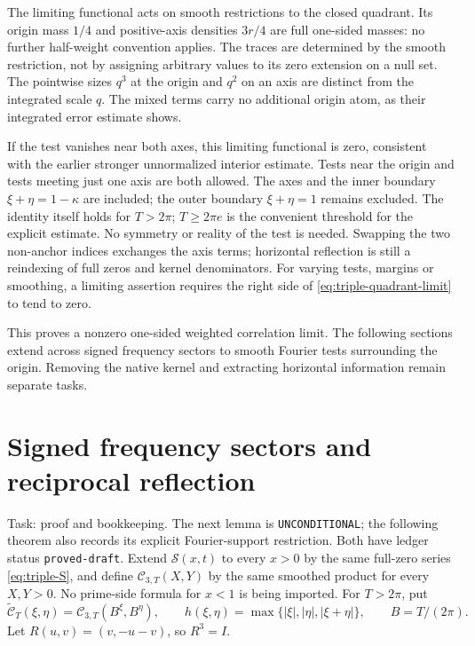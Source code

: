\documentclass[11pt]{article}
\newcommand{\ZS}{\mathcal S}
\newcommand{\CT}{\mathcal C_{3,T}}
\begin{document}
The limiting functional acts on smooth restrictions to the closed
quadrant. Its origin mass \(1/4\) and positive-axis densities \(3r/4\)
are full one-sided masses: no further half-weight convention applies.
The traces are determined by the smooth restriction, not by assigning
arbitrary values to its zero extension on a null set. The pointwise
sizes \(q^3\) at the origin and \(q^2\) on an axis are distinct from
the integrated scale \(q\). The mixed terms carry no additional origin
atom, as their integrated error estimate shows.

If the test vanishes near both axes, this limiting functional is zero,
consistent with the earlier stronger unnormalized interior estimate.
Tests near the origin and tests meeting just one axis are both allowed.
The axes and the inner boundary \(\xi+\eta=1-\kappa\) are included;
the outer boundary \(\xi+\eta=1\) remains excluded. The identity itself
holds for \(T>2\pi\); \(T\geq2\pi e\) is the convenient threshold
for the explicit estimate. No symmetry or reality of the test is needed.
Swapping the two non-anchor indices exchanges the axis terms; horizontal
reflection is still a reindexing of full zeros and kernel denominators.
For varying tests, margins or smoothing, a limiting assertion requires
the right side of \eqref{eq:triple-quadrant-limit} to tend to zero.

This proves a nonzero one-sided weighted correlation limit. The following
sections extend across signed frequency sectors to smooth Fourier tests
surrounding the origin. Removing the native kernel and extracting
horizontal information remain separate tasks.
\section{Signed frequency sectors and reciprocal reflection}

Task: proof and bookkeeping. The next lemma is \texttt{UNCONDITIONAL};
the following theorem also records its explicit Fourier-support
restriction. Both have ledger status \texttt{proved-draft}.
Extend \(\ZS(x,t)\) to every \(x>0\) by the same full-zero series
\eqref{eq:triple-S}, and define \(\CT(X,Y)\) by the same smoothed
product for every \(X,Y>0\). No prime-side formula for \(x<1\)
is being imported. For \(T>2\pi\), put
\[
 \widetilde{\mathcal C}_T(\xi,\eta)=\CT(B^\xi,B^\eta),\qquad
 h(\xi,\eta)=\max\{|\xi|,|\eta|,|\xi+\eta|\},
 \qquad B=T/(2\pi).
\]
Let \(R(u,v)=(v,-u-v)\), so \(R^3=I\).
\end{document}
